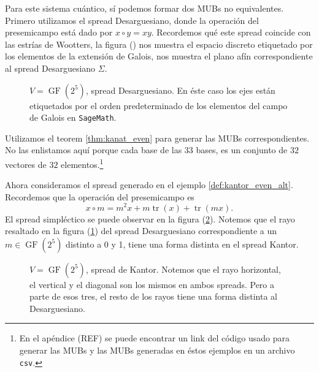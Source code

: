 \documentclass[a4paper]{report}
\DeclareMathOperator{\tr}{tr}
\DeclareMathOperator{\GF}{GF}
\begin{document}
  Para este sistema cuántico, sí podemos formar dos MUBs no
  equivalentes. Primero utilizamos el spread Desarguesiano,
  donde la operación del presemicampo está dado por $x \circ
  y = xy$.  Recordemos qué este spread coincide con las
  estrías de Wootters, la figura () nos muestra el espacio
  discreto etiquetado por los elementos de la extensión de
  Galois, nos muestra el plano afín correspondiente al
  spread Desarguesiano $\Sigma$.
  \begin{figure}[ht]
    \centering
    
    \caption{$V = \GF(2^{5})$, spread Desarguesiano. En éste
    caso los ejes están etiquetados por el orden
    predeterminado de los elementos del campo de Galois en
    \texttt{SageMath}.}
    \label{fig:2-5-desargues-plane}
  \end{figure}
  Utilizamos el teorem \ref{thm:kanat_even} para
  generar las MUBs correspondientes. No las enlistamos aquí
  porque cada base de las $33$ bases, es un conjunto de $32$ 
  vectores de $32$ elementos.\footnote{En el apéndice (REF)
  se puede encontrar un link del código usado para generar
  las MUBs y las MUBs generadas en éstos ejemplos en un
  archivo \texttt{csv}.}

  Ahora consideramos el spread generado en el ejemplo
  \ref{def:kantor_even_alt}. Recordemos que la operación del
  presemicampo es
  \begin{equation}
    \label{eqn:kantor_presemi}
    x \circ m
    = m^2 x + m \tr(x) + \tr(mx).
  \end{equation} 
  El spread simpléctico se puede observar en la figura
  (\ref{fig:2-5-kantor-plane}).  Notemos que el rayo
  resaltado en la figura (\ref{fig:2-5-desargues-plane}) del
  spread Desarguesiano correspondiente a un $m \in
  \GF(2^{5})$ distinto a 0 y 1, tiene una forma distinta en
  el spread Kantor.
  \begin{figure}[ht]
    \centering
    
    \caption{$V = \GF(2^{5})$, spread de Kantor. Notemos que
    el rayo horizontal, el vertical y el diagonal son los
    mismos en ambos spreads. Pero a parte de esos tres, el
    resto de los rayos tiene una forma distinta al
    Desarguesiano.}
    \label{fig:2-5-kantor-plane}
  \end{figure}
  
\end{document}
